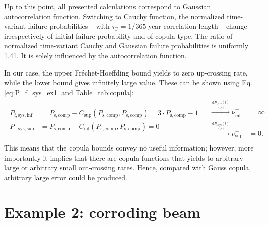 Up to this point, all presented calculations correspond to Gaussian autocorrelation function. Switching to Cauchy function, the normalized time-variant failure probabilities -- with $\tau_\mathrm{F} = 1/365$ year correlation length -- change irrespectively of initial failure probability and of copula type. The ratio of normalized time-variant Cauchy and Gaussian failure probabilities is uniformly 1.41. It is solely influenced by the autocorrelation function.

In our case, the upper Fréchet-Hoeffding bound yields to zero up-crossing rate, while the lower bound gives infinitely large value. These can be shown using Eq.\ref{eq:P_f_sys_ex1} and Table~\ref{tab:copula}:
\begin{equation}
	\begin{split}
		\begin{aligned}
			{P_{{\mathrm{f,sys,inf}}}} &= {P_{{\mathrm{s,comp}}}} - {C_{\sup }}\left( {{P_{{\mathrm{s,comp}}}},{P_{{\mathrm{s,comp}}}}} \right) = 3 \cdot {P_{{\mathrm{s,comp}}}} - 1\\
			{P_{{\mathrm{f,sys,sup}}}} &= {P_{{\mathrm{s,comp}}}} - {C_{\inf }}\left( {{P_{{\mathrm{s,comp}}}},{P_{{\mathrm{s,comp}}}}} \right) = 0
		\end{aligned}
	\end{split}
		\begin{split}
			\begin{aligned}
				\xrightarrow[]{{\frac{{{\mathrm{d}}{P_{{\mathrm{f,sys}}}}(t)}}{{{\mathrm{d}}\Delta t}}}} \nu _{\inf }^ +  &= \infty \\
				\xrightarrow[]{{\frac{{{\mathrm{d}}{P_{{\mathrm{f,sys}}}}(t)}}{{{\mathrm{d}}\Delta t}}}} \nu _{\sup }^ +  &= 0.
			\end{aligned}
		\end{split}
\end{equation}
This means that the copula bounds convey no useful information; however, more importantly it implies that there are copula functions that yields to arbitrary large or arbitrary small out-crossing rates. Hence, compared with Gauss copula, arbitrary large error could be produced.

\section{Example 2: corroding beam}

